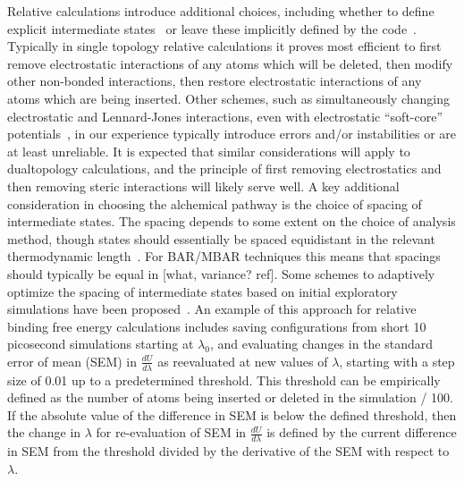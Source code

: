 \documentclass[9pt,bestpractices]{livecoms}
\begin{document}
%
Relative calculations introduce additional choices, including whether to define explicit intermediate states~\cite{} or leave these implicitly defined by the code~\cite{}.
Typically in single topology relative calculations it proves most efficient to first remove electrostatic interactions of any atoms which will be deleted, then modify other non-bonded interactions, then restore electrostatic interactions of any atoms which are being inserted.
Other schemes, such as simultaneously changing electrostatic and Lennard-Jones interactions, even with electrostatic ``soft-core'' potentials~\cite{steinbrecher2007nonlinear}, in our experience typically introduce errors and/or instabilities or are at least unreliable.
It is expected that similar considerations will apply to dualtopology calculations, and the principle of first removing electrostatics and then removing steric interactions will likely serve well.
%
A key additional consideration in choosing the alchemical pathway is the choice of spacing of intermediate states.
The spacing depends to some extent on the choice of analysis method, though states should essentially be spaced equidistant in the relevant thermodynamic length~\cite{crooks2007measuringa, sivak2012thermodynamic}.
For BAR/MBAR techniques this means that spacings should typically be equal in [what, variance? ref].
Some schemes to adaptively optimize the spacing of intermediate states based on initial exploratory simulations have been proposed~\cite{}.
%
An example of this approach for relative binding free energy calculations includes saving configurations from short 10 picosecond simulations starting at $\lambda_0$, and evaluating changes in the standard error of mean (SEM) in $\frac{dU}{d\lambda}$ as reevaluated at new values of $\lambda$, starting with a step size of 0.01 up to a predetermined threshold.
This threshold can be empirically defined as the number of atoms being inserted or deleted in the simulation / 100.
If the absolute value of the difference in SEM is below the defined threshold, then the change in $\lambda$ for re-evaluation of SEM in $\frac{dU}{d\lambda}$ is defined by the current difference in SEM from the threshold divided by the derivative of the SEM with respect to $\lambda$.
%
\end{document}

